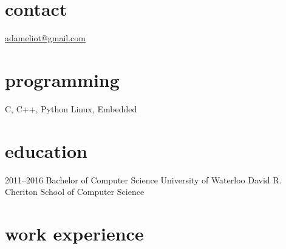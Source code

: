 \documentclass[]{eliot-cv} %
\begin{document}


\begin{aside} %
\section{contact}
\href{mailto:adameliot@gmail.com}{adameliot@gmail.com}
\section{programming}
C, C++, Python
Linux, Embedded
\end{aside}


\section{education}

\begin{entrylist}
\entry
{2011--2016}
{Bachelor {\normalfont of Computer Science}}
{University of Waterloo}
{David R. Cheriton School of Computer Science\\}

\end{entrylist}


\section{work experience}
\end{document}
